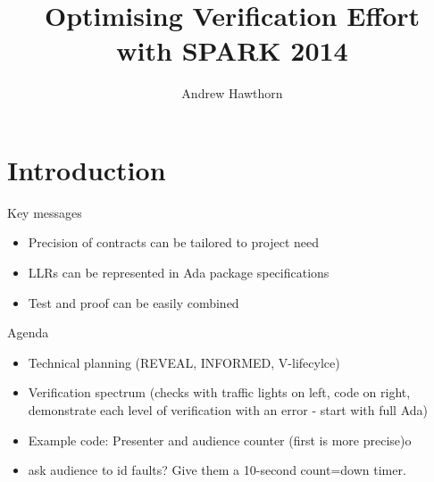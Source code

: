 \documentclass{beamer}
\title{Optimising Verification Effort\\with SPARK 2014}
\author{Andrew Hawthorn}
\begin{document}
\begin{altrantitle}
\end{altrantitle}


\makeatletter
\newenvironment{btHighlight}[1][]
{\begingroup\tikzset{bt@Highlight@par/.style={#1}}\begin{lrbox}{\@tempboxa}}
{\end{lrbox}\bt@HL@box[bt@Highlight@par]{\@tempboxa}\endgroup}

\newcommand\btHL[1][]{%
  \begin{btHighlight}[#1]\bgroup\aftergroup\bt@HL@endenv%
}
\def\bt@HL@endenv{%
  \end{btHighlight}%
  \egroup
}
\newcommand{\bt@HL@box}[2][]{%
  \tikz[remember picture]{%
    \pgfpathrectangle{\pgfpoint{1pt}{0pt}}{\pgfpoint{\wd #2}{\ht #2}}%
    \pgfusepath{use as bounding box}%
    \node[anchor=base west,%
          outer sep=0pt,%
          inner xsep=1pt,%
          inner ysep=0pt,%
          rounded corners=2pt,%
          minimum height=\ht\strutbox+1pt,%
          #1]%
          {%
            \raisebox{1pt}{\strut}\strut\usebox{#2}%
          };%
  }%
}
\makeatother

\section{Introduction}

\begin{frame}[fragile]{Key messages}
  \begin{itemize}
  \item Precision of contracts can be tailored to project need
  \item LLRs can be represented in Ada package specifications
  \item Test and proof can be easily combined

  \end{itemize}
\end{frame}

\begin{frame}[fragile]{Agenda}
  \begin{itemize}
     \item Technical planning (REVEAL, INFORMED, V-lifecylce)
     \item Verification spectrum (checks with traffic lights on left, code on right, demonstrate each level of verification with an error - start with full Ada)
     \item Example code: Presenter and audience counter (first is more precise)o
     \item ask audience to id faults? Give them a 10-second count=down timer.
  \end{itemize}
\end{frame}
\end{document}

